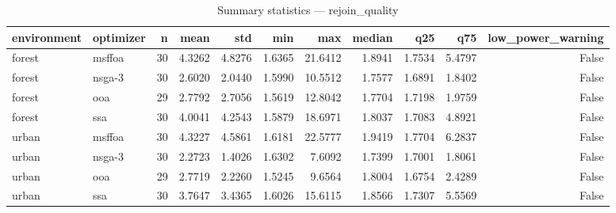 \begin{table}
\caption{Summary statistics — rejoin_quality}
\label{tab:online_summary-rejoin_quality}
\begin{tabular}{llrrrrrrrrr}
\toprule
environment & optimizer & n & mean & std & min & max & median & q25 & q75 & low\_power\_warning \\
\midrule
forest & msffoa & 30 & 4.3262 & 4.8276 & 1.6365 & 21.6412 & 1.8941 & 1.7534 & 5.4797 & False \\
forest & nsga-3 & 30 & 2.6020 & 2.0440 & 1.5990 & 10.5512 & 1.7577 & 1.6891 & 1.8402 & False \\
forest & ooa & 29 & 2.7792 & 2.7056 & 1.5619 & 12.8042 & 1.7704 & 1.7198 & 1.9759 & False \\
forest & ssa & 30 & 4.0041 & 4.2543 & 1.5879 & 18.6971 & 1.8037 & 1.7083 & 4.8921 & False \\
urban & msffoa & 30 & 4.3227 & 4.5861 & 1.6181 & 22.5777 & 1.9419 & 1.7704 & 6.2837 & False \\
urban & nsga-3 & 30 & 2.2723 & 1.4026 & 1.6302 & 7.6092 & 1.7399 & 1.7001 & 1.8061 & False \\
urban & ooa & 29 & 2.7719 & 2.2260 & 1.5245 & 9.6564 & 1.8004 & 1.6754 & 2.4289 & False \\
urban & ssa & 30 & 3.7647 & 3.4365 & 1.6026 & 15.6115 & 1.8566 & 1.7307 & 5.5569 & False \\
\bottomrule
\end{tabular}
\end{table}
